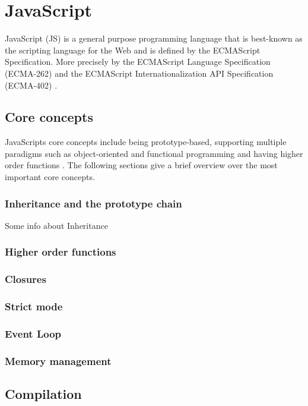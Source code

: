 \clearpage

\chapter{\textbf{JavaScript}}\label{javascript}

JavaScript (JS) is a general purpose programming language that is best-known as the scripting language for the Web and is defined by the ECMAScript Specification.
More precisely by the ECMAScript Language Specification (ECMA-262) and the ECMAScript Internationalization API Specification (ECMA-402) \cite{mdn_js}.

\section{Core concepts}\label{js:core-concepts}
JavaScripts core concepts include being prototype-based, supporting multiple paradigms such as object-oriented and functional programming and having higher order functions \cite{mdn_js}. The following sections give a brief overview over the most important core concepts.

\subsection{Inheritance and the prototype chain}


Some info about Inheritance

\subsection{Higher order functions}
\subsection{Closures}
\subsection{Strict mode}
\subsection{Event Loop}
\subsection{Memory management}

\section{Compilation}

